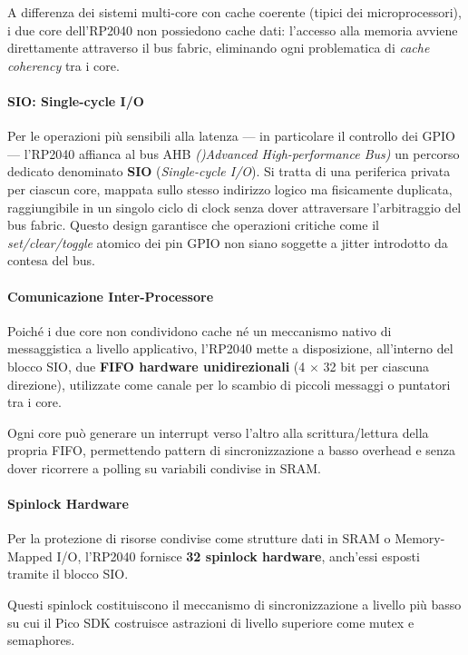 A differenza dei sistemi multi-core con cache coerente (tipici dei microprocessori), i due core dell'RP2040 non possiedono cache dati: l'accesso alla memoria avviene direttamente attraverso il bus fabric, eliminando ogni problematica di \textit{cache coherency} tra i core.

\paragraph{SIO: Single-cycle I/O}

Per le operazioni più sensibili alla latenza — in particolare il controllo dei GPIO — l'RP2040 affianca al bus AHB \textit{()Advanced High-performance Bus)} un percorso dedicato denominato \textbf{SIO} (\textit{Single-cycle I/O}). Si tratta di una periferica privata per ciascun core, mappata sullo stesso indirizzo logico ma fisicamente duplicata, raggiungibile in un singolo ciclo di clock senza dover attraversare l'arbitraggio del bus fabric. Questo design garantisce che operazioni critiche come il \textit{set/clear/toggle} atomico dei pin GPIO non siano soggette a jitter introdotto da contesa del bus.

\paragraph{Comunicazione Inter-Processore}

Poiché i due core non condividono cache né un meccanismo nativo di messaggistica a livello applicativo, l'RP2040 mette a disposizione, all'interno del blocco SIO, due \textbf{FIFO hardware unidirezionali} (4 $\times$ 32 bit per ciascuna direzione), utilizzate come canale per lo scambio di piccoli messaggi o puntatori tra i core.

Ogni core può generare un interrupt verso l'altro alla scrittura/lettura della propria FIFO, permettendo pattern di sincronizzazione a basso overhead e senza dover ricorrere a polling su variabili condivise in SRAM.

\paragraph{Spinlock Hardware}

Per la protezione di risorse condivise come strutture dati in SRAM o Memory-Mapped I/O, l'RP2040 fornisce \textbf{32 spinlock hardware}, anch'essi esposti tramite il blocco SIO. 


Questi spinlock costituiscono il meccanismo di sincronizzazione a livello più basso su cui il Pico SDK costruisce astrazioni di livello superiore come mutex e semaphores.


